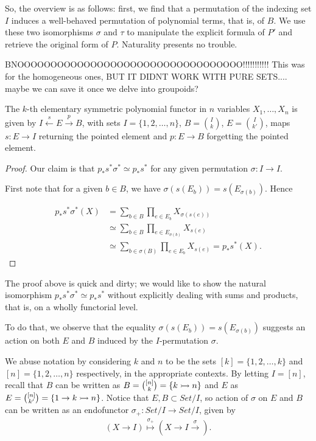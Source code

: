So, the overview is as follows: first, we find that a permutation of the indexing set $I$ induces a well-behaved permutation of polynomial terms, that is, of $B$. We use these two isomorphisms $\sigma$ and $\tau$ to manipulate the explicit formula of $P'$ and retrieve the original form of $P$. Naturality presents no trouble.

BNOOOOOOOOOOOOOOOOOOOOOOOOOOOOOOOOOO!!!!!!!!!!! This was for the homogeneous ones, BUT IT DIDNT WORK WITH PURE SETS.... maybe we can save it once we delve into groupoids?

\begin{proposition}
The $k$-th elementary symmetric polynomial functor in $n$ variables $X_1,\dots,X_n$ is given by $I\overset{s}{\gets} E\overset{p}{\to} B$, with sets $I=\{1,2,\dots,n\}$, $B=\binom{I}{k}$, $E=\binom{I}{k'}$, maps $s:E\to I$ returning the pointed element and $p:E\to B$ forgetting the pointed element.
\end{proposition}
\begin{proof}
Our claim is that $p_*s^*\sigma^* \simeq p_*s^*$ for any given permutation $\sigma:I\to I$.

First note that for a given $b\in B$, we have $\sigma(s(E_b))=s(E_{\sigma(b)})$. Hence

\begin{align*}
	p_*s^*\sigma^*(X) &= \sum_{b\in B}\prod_{e\in E_b} X_{\sigma(s(e))}\\
		&\simeq \sum_{b\in B}\prod_{e\in E_{\sigma(b)}} X_{s(e)}\\
        &\simeq \sum_{b\in \sigma(B)}\prod_{e\in E_b} X_{s(e)} = p_*s^*(X).
\end{align*}
\end{proof}

The proof above is quick and dirty; we would like to show the natural isomorphism $p_*s^*\sigma^* \simeq p_*s^*$ without explicitly dealing with sums and products, that is, on a wholly functorial level.

To do that, we observe that the equality $\sigma(s(E_b))=s(E_{\sigma(b)})$ suggests an action on both $E$ and $B$ induced by the $I$-permutation $\sigma$.

We abuse notation by considering $k$ and $n$ to be the sets $[k]=\{1,2,\dots,k\}$ and $[n]=\{1,2,\dots,n\}$ respectively, in the appropriate contexts. By letting $I=[n]$, recall that $B$ can be written as $B=\binom{[n]}{k}=\{k\rightarrowtail n\}$ and $E$ as $E=\binom{[n]}{k'}=\{1\to k\rightarrowtail n\}$. Notice that $E,B\subset Set/I$, so action of $\sigma$ on $E$ and $B$ can be written as an endofunctor $\sigma_+:Set/I\to Set/I$, given by
\begin{align*}
(X\to I) \overset{\sigma_+}{\mapsto} (X\to I\overset{\sigma}{\to}).
\end{align*}

